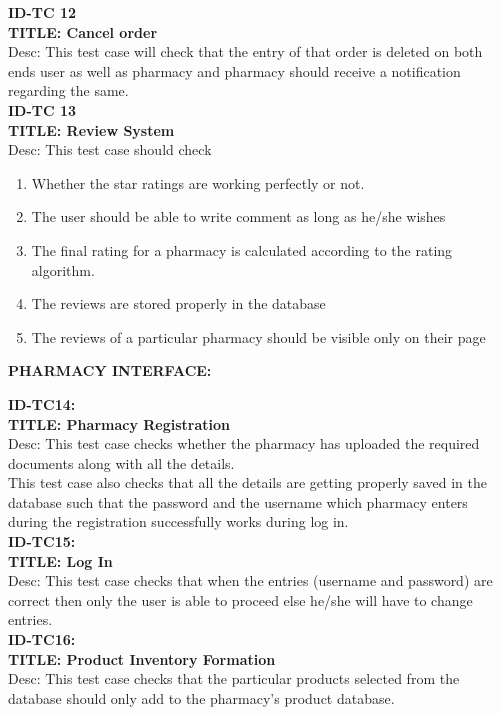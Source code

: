 \documentclass{article}
\begin{document}
 \textbf{ID-TC 12}\\
 \textbf{TITLE: Cancel order}\\
Desc: This test case will check that the entry of that order is deleted on both ends user as well as pharmacy and pharmacy should receive a notification regarding the same.\\

 \textbf{ID-TC 13}\\
 \textbf{TITLE: Review System}\\
Desc: This test case should check
\begin{enumerate}
\item	Whether the star ratings are working perfectly or not.
\item The user should be able to write comment as long as he/she wishes
\item The final rating  for a pharmacy is calculated according to the rating algorithm.
\item The reviews are stored properly in the database 
\item The reviews of a particular pharmacy should be visible only on their page
\end{enumerate}
\vspace{0.5cm}
 \textbf{PHARMACY INTERFACE:}
\vspace{0.5cm}

 \textbf{ID-TC14:}\\
 \textbf{TITLE: Pharmacy Registration}\\
Desc: This test case checks whether the pharmacy has uploaded the required documents along with all the details.\\
This test case also checks that all the details are getting properly saved in the database such that the password and the username which pharmacy enters during the registration successfully works during log in.\\

 \textbf{ID-TC15:}\\
 \textbf{TITLE: Log In}\\
Desc: This test case checks that when the entries (username and password) are correct then only the user is able to proceed else he/she will have to change entries.\\

 \textbf{ID-TC16:}\\
 \textbf{TITLE: Product Inventory Formation}\\
Desc: This test case checks that the particular products selected from the database should only add to the pharmacy’s product database.\\
\end{document}
